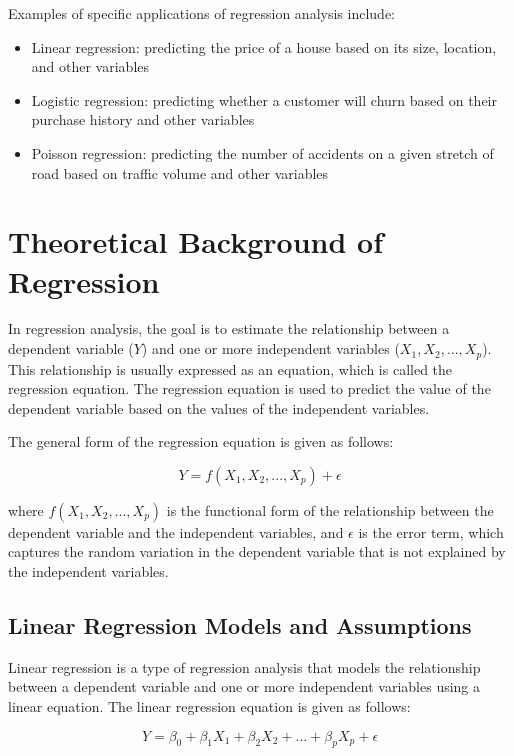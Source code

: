 \documentclass{article}
\begin{document}
Examples of specific applications of regression analysis include:

\begin{itemize}
\item Linear regression: predicting the price of a house based on its size, location, and other variables
\item Logistic regression: predicting whether a customer will churn based on their purchase history and other variables
\item Poisson regression: predicting the number of accidents on a given stretch of road based on traffic volume and other variables
\end{itemize}

\section{Theoretical Background of Regression}

In regression analysis, the goal is to estimate the relationship between a dependent variable ($Y$) and one or more independent variables ($X_1, X_2, ..., X_p$). This relationship is usually expressed as an equation, which is called the regression equation. The regression equation is used to predict the value of the dependent variable based on the values of the independent variables.

The general form of the regression equation is given as follows:

\begin{equation}
Y = f(X_1, X_2, ..., X_p) + \epsilon
\end{equation}

where $f(X_1, X_2, ..., X_p)$ is the functional form of the relationship between the dependent variable and the independent variables, and $\epsilon$ is the error term, which captures the random variation in the dependent variable that is not explained by the independent variables.

\subsection{Linear Regression Models and Assumptions}
Linear regression is a type of regression analysis that models the relationship between a dependent variable and one or more independent variables using a linear equation. The linear regression equation is given as follows:

\begin{equation}
Y = \beta_0 + \beta_1X_1 + \beta_2X_2 + ... + \beta_pX_p + \epsilon
\end{equation}
\end{document}
